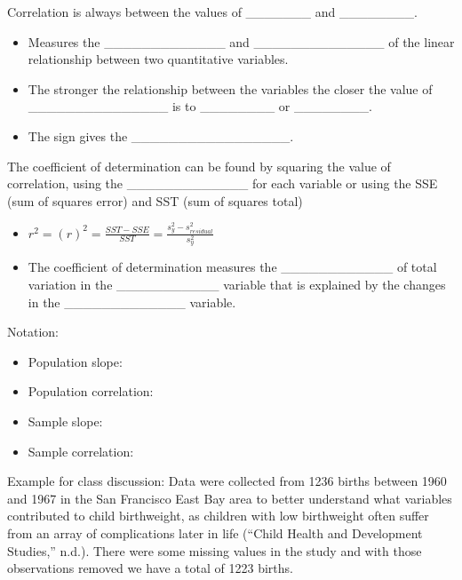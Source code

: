 \documentclass[
]{report}
\begin{document}
Correlation is always between the values of \_\_\_\_\_\_\_ and \_\_\_\_\_\_\_\_.

\begin{itemize}
\item
  Measures the \_\_\_\_\_\_\_\_\_\_\_\_\_ and \_\_\_\_\_\_\_\_\_\_\_\_\_\_ of the linear relationship between two quantitative variables.
\item
  The stronger the relationship between the variables the closer the value of \_\_\_\_\_\_\_\_\_\_\_\_\_\_\_ is to \_\_\_\_\_\_\_\_ or \_\_\_\_\_\_\_\_.
\item
  The sign gives the \_\_\_\_\_\_\_\_\_\_\_\_\_\_\_\_\_.
\end{itemize}

The coefficient of determination can be found by squaring the value of correlation, using the \_\_\_\_\_\_\_\_\_\_\_\_\_ for each variable or using the SSE (sum of squares error) and SST (sum of squares total)

\begin{itemize}
\item
  \(r^2 = (r)^2 = \frac{SST - SSE}{SST} = \frac{s^2_y - s^2_{residual}}{s^2_y}\)
\item
  The coefficient of determination measures the \_\_\_\_\_\_\_\_\_\_\_\_ of total variation in the \_\_\_\_\_\_\_\_\_\_\_ variable that is explained by the changes in the \_\_\_\_\_\_\_\_\_\_\_\_\_ variable.
\end{itemize}

Notation:

\begin{itemize}
\item
  Population slope:
\item
  Population correlation:
\item
  Sample slope:
\item
  Sample correlation:
\end{itemize}


\vspace{1mm}

Example for class discussion: Data were collected from 1236 births between 1960 and 1967 in the San Francisco East Bay area to better understand what variables contributed to child birthweight, as children with low birthweight often suffer from an array of complications later in life ({``Child Health and Development Studies,''} n.d.). There were some missing values in the study and with those observations removed we have a total of 1223 births.
\end{document}
